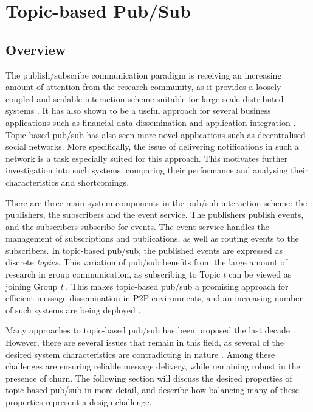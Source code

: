 \section{Topic-based Pub/Sub}

\subsection{ Overview }

The publish/subscribe communication paradigm is receiving an increasing
amount of attention from the research community, as it provides a
loosely coupled and scalable interaction scheme suitable for large-scale
distributed systems \cite{Eugster:2003}. It has also shown to be a useful
approach for several business applications such as financial data
dissemination \cite{tibcorv} and application integration \cite{goops}.
Topic-based pub/sub has also seen more novel applications such as
decentralised social networks. More specifically, the issue of
delivering notifications in such a network is a task especially suited
for this approach. This motivates further investigation into such
systems, comparing their performance and analysing their
characteristics and shortcomings. 

There are three main system components in the pub/sub interaction
scheme: the publishers, the subscribers and the event service. The
publishers publish events, and the subscribers subscribe for events. The
event service handles the management of subscriptions and publications,
as well as routing events to the subscribers. In topic-based pub/sub,
the published events are expressed as discrete \emph{topics}. This
variation of pub/sub benefits from the large amount of research in group
communication, as subscribing to Topic \emph{t} can be viewed as joining
Group \emph{t} \cite{Eugster:2003}. This makes topic-based pub/sub a
promising approach for efficient message dissemination in P2P
environments, and an increasing number of such systems are being
deployed \cite{Triantafillou:2009}. 

Many approaches to topic-based pub/sub has been proposed the last decade
\cites{Baehni:2004}{Castro:2002}{Chockler:2007}{Rahimian:2011}{Girdzijauskas:2010}{Matos:2010}{Wong:2008}{Zhuang:2001}.
However, there are several issues that remain in this field, as several
of the desired system characteristics are contradicting in nature
\cite{Setty:2012}. Among these challenges are ensuring reliable message
delivery, while remaining robust in the presence of churn. The following
section will discuss the desired properties of topic-based pub/sub in
more detail, and describe how balancing many of these properties
represent a design challenge.

